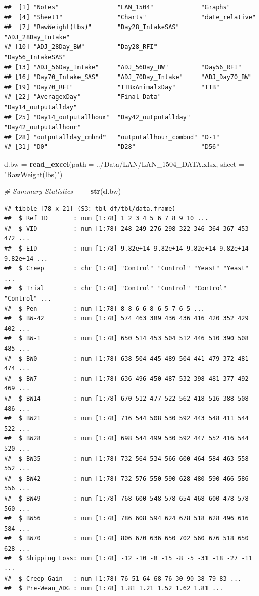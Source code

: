 \documentclass[
]{book}
\newenvironment{Shaded}{\begin{snugshade}}{\end{snugshade}}
\newcommand{\AttributeTok}[1]{\textcolor[rgb]{0.13,0.29,0.53}{#1}}
\newcommand{\CommentTok}[1]{\textcolor[rgb]{0.56,0.35,0.01}{\textit{#1}}}
\newcommand{\FunctionTok}[1]{\textcolor[rgb]{0.13,0.29,0.53}{\textbf{#1}}}
\newcommand{\NormalTok}[1]{#1}
\newcommand{\OtherTok}[1]{\textcolor[rgb]{0.56,0.35,0.01}{#1}}
\newcommand{\StringTok}[1]{\textcolor[rgb]{0.31,0.60,0.02}{#1}}
\begin{document}
\begin{verbatim}
##  [1] "Notes"                "LAN_1504"             "Graphs"              
##  [4] "Sheet1"               "Charts"               "date_relative"       
##  [7] "RawWeight(lbs)"       "Day28_IntakeSAS"      "ADJ_28Day_Intake"    
## [10] "ADJ_28Day_BW"         "Day28_RFI"            "Day56_IntakeSAS"     
## [13] "ADJ_56Day_Intake"     "ADJ_56Day_BW"         "Day56_RFI"           
## [16] "Day70_Intake_SAS"     "ADJ_70Day_Intake"     "ADJ_Day70_BW"        
## [19] "Day70_RFI"            "TTBxAnimalxDay"       "TTB"                 
## [22] "AveragexDay"          "Final Data"           "Day14_outputallday"  
## [25] "Day14_outputallhour"  "Day42_outputallday"   "Day42_outputallhour" 
## [28] "outputallday_cmbnd"   "outputallhour_combnd" "D-1"                 
## [31] "D0"                   "D28"                  "D56"
\end{verbatim}

\begin{Shaded}
\begin{Highlighting}[]
\NormalTok{d.bw }\OtherTok{=} \FunctionTok{read\_excel}\NormalTok{(}\AttributeTok{path =} \StringTok{\textquotesingle{}../Data/LAN/LAN\_1504\_DATA.xlsx\textquotesingle{}}\NormalTok{,}
                   \AttributeTok{sheet =} \StringTok{"RawWeight(lbs)"}\NormalTok{)}

\CommentTok{\# Summary Statistics {-}{-}{-}{-}{-}}
\FunctionTok{str}\NormalTok{(d.bw)}
\end{Highlighting}
\end{Shaded}

\begin{verbatim}
## tibble [78 x 21] (S3: tbl_df/tbl/data.frame)
##  $ Ref ID       : num [1:78] 1 2 3 4 5 6 7 8 9 10 ...
##  $ VID          : num [1:78] 248 249 276 298 322 346 364 367 453 472 ...
##  $ EID          : num [1:78] 9.82e+14 9.82e+14 9.82e+14 9.82e+14 9.82e+14 ...
##  $ Creep        : chr [1:78] "Control" "Control" "Yeast" "Yeast" ...
##  $ Trial        : chr [1:78] "Control" "Control" "Control" "Control" ...
##  $ Pen          : num [1:78] 8 8 6 6 8 6 5 7 6 5 ...
##  $ BW-42        : num [1:78] 574 463 389 436 436 416 420 352 429 402 ...
##  $ BW-1         : num [1:78] 650 514 453 504 512 446 510 390 508 485 ...
##  $ BW0          : num [1:78] 638 504 445 489 504 441 479 372 481 474 ...
##  $ BW7          : num [1:78] 636 496 450 487 532 398 481 377 492 469 ...
##  $ BW14         : num [1:78] 670 512 477 522 562 418 516 388 508 486 ...
##  $ BW21         : num [1:78] 716 544 508 530 592 443 548 411 544 522 ...
##  $ BW28         : num [1:78] 698 544 499 530 592 447 552 416 544 520 ...
##  $ BW35         : num [1:78] 732 564 534 566 600 464 584 463 558 552 ...
##  $ BW42         : num [1:78] 732 576 550 590 628 480 590 466 586 556 ...
##  $ BW49         : num [1:78] 768 600 548 578 654 468 600 478 578 560 ...
##  $ BW56         : num [1:78] 786 608 594 624 678 518 628 496 616 584 ...
##  $ BW70         : num [1:78] 806 670 636 650 702 560 676 518 650 628 ...
##  $ Shipping Loss: num [1:78] -12 -10 -8 -15 -8 -5 -31 -18 -27 -11 ...
##  $ Creep_Gain   : num [1:78] 76 51 64 68 76 30 90 38 79 83 ...
##  $ Pre-Wean_ADG : num [1:78] 1.81 1.21 1.52 1.62 1.81 ...
\end{verbatim}
\end{document}
